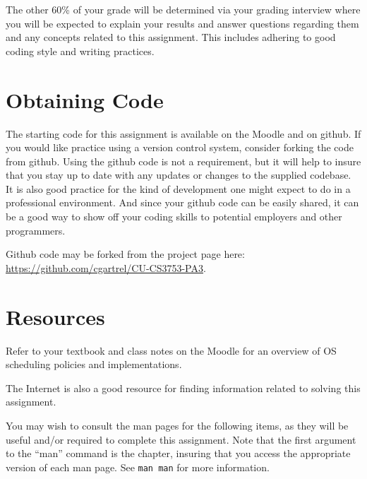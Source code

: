 \documentclass[12pt]{article}
\begin{document}
The other 60\% of your grade will be determined via your grading
interview where you will be expected to explain your results and answer
questions regarding them and any concepts related to this assignment.
This includes adhering to good coding style and writing practices.

\section{Obtaining Code}
The starting code for this assignment is available on the Moodle and
on github. If you would like practice using a version control system,
consider forking the code from github. Using the github code is not
a requirement, but it will help to insure that you stay up to date
with any updates or changes to the supplied codebase. It is also
good practice for the kind of development one might expect to do in
a professional environment. And since your github code can be easily
shared, it can be a good way to show off your coding skills to
potential employers and other programmers.

Github code may be forked from the project page here:\\
\url{https://github.com/cgartrel/CU-CS3753-PA3}.

\section{Resources}
Refer to your textbook and class notes on the Moodle for an overview
of OS scheduling policies and implementations.

The Internet\cite{tubes} is also a good resource for finding
information related to solving this assignment.

You may wish to consult the man pages for the following items, as they
will be useful and/or required to complete this assignment. Note that
the first argument to the ``man'' command is the chapter, insuring
that you access the appropriate version of each man page. See
\texttt{man man} for more information.
\end{document}
